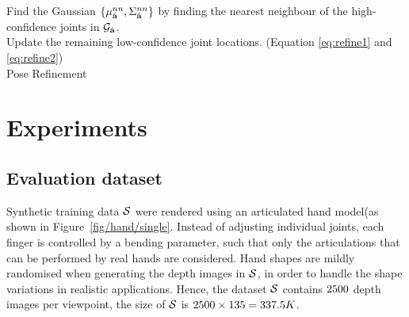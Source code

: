 \begin{algorithm}
	Find the Gaussian $\{\mu_{\hat{\mathbf{a}}}^{nn},\Sigma_{\hat{\mathbf{a}}}^{nn}\}$ by finding the nearest neighbour of the high-confidence joints in $\mathcal{G}_{\hat{\mathbf{a}}}$.\\ 
	Update the remaining low-confidence joint locations. (Equation \ref{eq:refine1} and \ref{eq:refine2}) \\
	\caption{Pose Refinement} 
	\label{alg:testing}
\end{algorithm}


\section{Experiments}



\subsection{Evaluation dataset} 

\label{sec/hand/methodology:eval}
Synthetic training data $\mathcal{S}$ were rendered using an articulated hand model(as shown in Figure~\ref{fig/hand/single}.
Instead of adjusting individual joints, each finger is controlled by a bending parameter, such that only the articulations that can be performed by real hands are considered. 
Hand shapes are mildly randomised when generating the depth images in $\mathcal{S}$, in order to handle the shape variations in realistic applications. 
Hence, the dataset $\mathcal{S}$ contains $2500$ depth images per viewpoint, the size of $\mathcal{S}$ is $2500 \times 135 = 337.5K$. 

